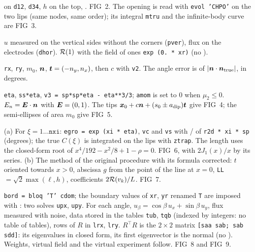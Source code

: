   on \texttt{d12}, \texttt{d34}, 
$h$ on the top, . FIG~2. The opening is read with
\texttt{evol 'CHPO'} on the two lips (same nodes, same order); its integral
\texttt{mtru} and the infinite-body curve are FIG~3.

 $u$ measured on the vertical sides without the
corners (\texttt{pver}), flux on the electrodes (\texttt{dhor}). $\mathcal{R}(1)$ with the
field of ones \texttt{exp (0. * xr)} (no ).

 \texttt{rx}, \texttt{ry}, $m_0$, $\bm{n}$,
$\bm{t}=(-n_y,n_x)$, then $c$ with \texttt{v2}. The angle error is 
of $|\bm{n}\cdot\bm{n}_{\rm true}|$, in degrees.

 \texttt{eta}, \texttt{ss*eta},
\texttt{v3 = sp*sp*eta - eta**3/3}; \texttt{amom} is set to 0 when $\mu_2\le0$.
$E_n=\bm{E}\cdot\bm{n}$ with $\bm{E}=(0,1)$. The tips $\bm{x}_0+c\bm{n}+(s_0\pm a_{\rm dip})\bm{t}$
give FIG~4; the semi-ellipses of area $m_0$ give FIG~5.

 (a) For $\xi=1\dots\texttt{nxi}$:
\texttt{egro = exp (xi * eta)}, \texttt{vc} and \texttt{vs} with /
of \texttt{r2d * xi * sp} (degrees); the true $C(\xi)$ is integrated on the lips
with \texttt{ztrap}. The length uses the closed-form root of
$x^4/192-x^2/8+1-\rho=0$. FIG~6, with $2J_1(x)/x$ by its series.
(b) The method of the original procedure with its formula corrected:
$t$ oriented towards $x>0$, abscissa $g$ from the point of the line at $x=0$,
\texttt{LL} $=\sqrt2\max(\ell,h)$, coefficients $2\mathcal{R}(v_k)/L$. FIG~7.

 \texttt{bord = bloq 'T' cdom}; the
boundary values of \texttt{xr}, \texttt{yr} renamed \texttt{T} are imposed with
: two solves \texttt{upx}, \texttt{upy}. For each angle,
$u_\beta=\cos\beta\,u_x+\sin\beta\,u_y$, flux measured with noise, data stored
in the tables \texttt{tub}, \texttt{tqb} (indexed by integers: no table of
tables), rows of $R$ in \texttt{lrx}, \texttt{lry}. $R^\top R$ is the $2\times2$
matrix \texttt{[saa sab; sab sdd]}: its eigenvalues in closed form, its first
eigenvector is the normal (no ). Weights, virtual field and the
virtual experiment follow. FIG~8 and FIG~9.

